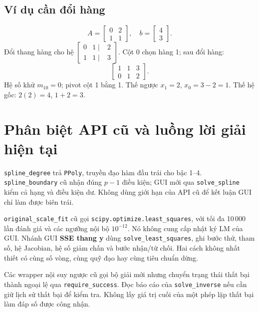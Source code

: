 \subsection{Ví dụ cần đổi hàng}
\[
 A=\begin{bmatrix}0&2\\1&1\end{bmatrix},\quad b=\begin{bmatrix}4\\3\end{bmatrix}.
\]
Đổi thang hàng cho hệ $\left[\begin{smallmatrix}0&1\mid&2\\1&1\mid&3\end{smallmatrix}\right]$. Cột 0 chọn hàng 1; sau đổi hàng:
\[
 \left[\begin{array}{cc|c}1&1&3\\0&1&2\end{array}\right].
\]
Hệ số khử $m_{10}=0$; pivot cột 1 bằng 1. Thế ngược $x_1=2$, $x_0=3-2=1$. Thế hệ gốc: $2(2)=4$, $1+2=3$.

\section{Phân biệt API cũ và luồng lời giải hiện tại}
\texttt{spline\_degree} trả \texttt{PPoly}, truyền đạo hàm đầu trái cho bậc 1--4. \texttt{spline\_boundary} cũ nhận đúng $p-1$ điều kiện; GUI mới qua \texttt{solve\_spline} kiểm cả hạng và điều kiện dư. Không dùng giới hạn của API cũ để kết luận GUI chỉ làm được biên trái.

\texttt{original\_scale\_fit} cũ gọi \texttt{scipy.optimize.least\_squares}, với tối đa 10\,000 lần đánh giá và các ngưỡng nội bộ $10^{-12}$. Nó không cung cấp nhật ký LM của GUI. Nhánh GUI \textbf{SSE thang y} dùng \texttt{solve\_least\_squares}, ghi bước thử, tham số, hệ Jacobian, hệ số giảm chấn và bước nhận/từ chối. Hai cách không nhất thiết có cùng số vòng, cùng quỹ đạo hay cùng tiêu chuẩn dừng.

Các wrapper nội suy ngược cũ gọi bộ giải mới nhưng chuyển trạng thái thất bại thành ngoại lệ qua \texttt{require\_success}. Đọc báo cáo của \texttt{solve\_inverse} nếu cần giữ lịch sử thất bại để kiểm tra. Không lấy giá trị cuối của một phép lặp thất bại làm đáp số được công nhận.
